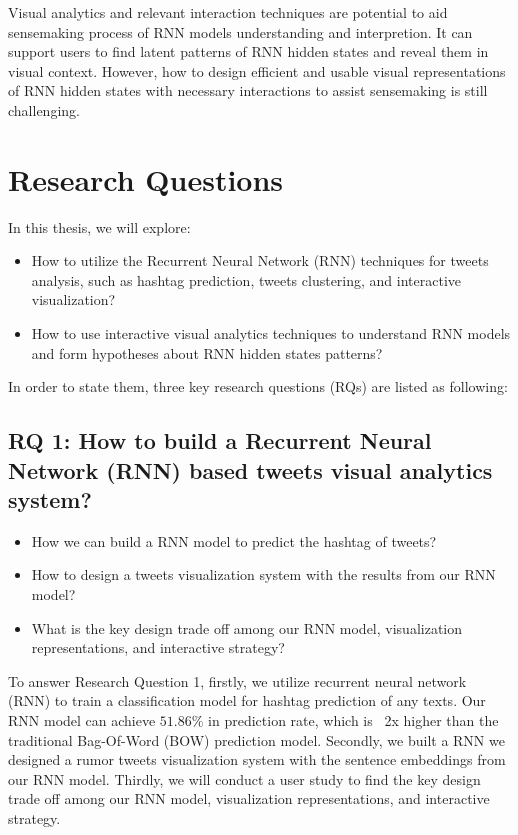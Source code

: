 Visual analytics and relevant interaction techniques are potential to aid sensemaking process \cite{Pirolli2005} of RNN models understanding and interpretion. It can support users to find latent patterns of RNN hidden states and reveal them in visual context. However, how to design efficient and usable visual representations of RNN hidden states with necessary interactions to assist sensemaking is still challenging.

\section{Research Questions}

In this thesis, we will explore:

\begin{itemize}
    \item How to utilize the Recurrent Neural Network (RNN) techniques for tweets analysis, such as hashtag prediction, tweets clustering, and interactive visualization?
    \item How to use interactive visual analytics techniques to understand RNN models and form hypotheses about RNN hidden states patterns?
\end{itemize}


In order to state them, three key research questions (RQs) are listed as following: 

\subsection{RQ 1: How to build a Recurrent Neural Network (RNN) based tweets visual analytics system?}

\begin{itemize}
    \item How we can build a RNN model to predict the hashtag of tweets?
    
    \item How to design a tweets visualization system with the results from our RNN model? 
    
    \item What is the key design trade off among our RNN model, visualization representations, and interactive strategy?
\end{itemize}

To answer Research Question 1,  firstly, we utilize recurrent neural network (RNN) to train a classification model for hashtag prediction of any texts. Our RNN model can achieve $51.86\%$ in prediction rate, which is ~2x higher than the traditional Bag-Of-Word (BOW) prediction model. Secondly, we built a RNN we designed a rumor tweets visualization system with the sentence embeddings from our RNN model. Thirdly, we will conduct a user study to find the key design trade off among our RNN model, visualization representations, and interactive strategy.

